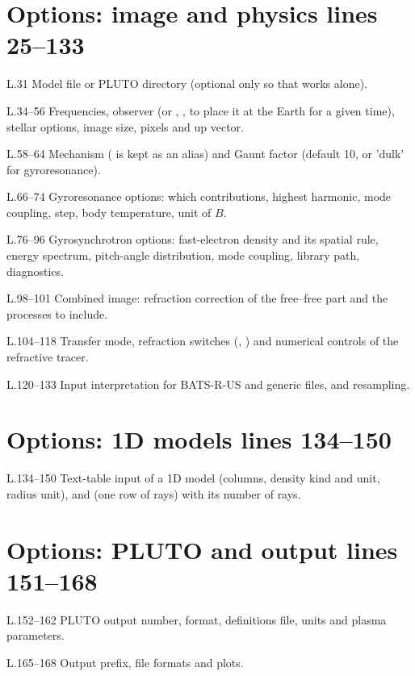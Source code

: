 \section*{\normalsize Options: image and physics \hfill{\small\mdseries\color{gray}lines 25--133}}

\begin{lines}
\item[L.31] Model file or PLUTO directory (optional only so that  works alone).
\item[L.34–56] Frequencies, observer (or , ,  to place it at the Earth for a given time), stellar options, image size, pixels and up vector.
\item[L.58–64] Mechanism ( is kept as an alias) and Gaunt factor (default 10, or 'dulk' for gyroresonance).
\item[L.66–74] Gyroresonance options: which contributions, highest harmonic, mode coupling, step, body temperature, unit of $B$.
\item[L.76–96] Gyrosynchrotron options: fast-electron density and its spatial rule, energy spectrum, pitch-angle distribution, mode coupling, library path, diagnostics.
\item[L.98–101] Combined image: refraction correction of the free--free part and the processes to include.
\item[L.104–118] Transfer mode, refraction switches (, ) and numerical controls of the refractive tracer.
\item[L.120–133] Input interpretation for BATS-R-US and generic files, and resampling.
\end{lines}
\section*{\normalsize Options: 1D models \hfill{\small\mdseries\color{gray}lines 134--150}}

\begin{lines}
\item[L.134–150] Text-table input of a 1D model (columns, density kind and unit, radius unit), and  (one row of rays) with its number of rays.
\end{lines}
\section*{\normalsize Options: PLUTO and output \hfill{\small\mdseries\color{gray}lines 151--168}}

\begin{lines}
\item[L.152–162] PLUTO output number, format, definitions file, units and plasma parameters.
\item[L.165–168] Output prefix, file formats and plots.
\end{lines}
